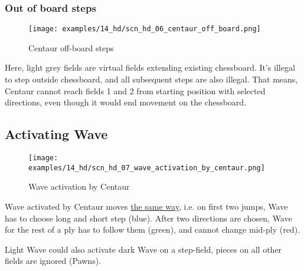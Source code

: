 \clearpage %

\subsubsection*{Out of board steps}

\vspace*{-0.05\textwidth}
\noindent
\begin{figure}[!h]
\texttt{[image: examples/14\_hd/scn\_hd\_06\_centaur\_off\_board.png]}
\caption{Centaur off-board steps}
\label{fig:scn_hd_06_centaur_off_board}
\end{figure}

Here, light grey fields are virtual fields extending existing chessboard.
It's illegal to step outside chessboard, and all subsequent steps are also
illegal. That means, Centaur cannot reach fields 1 and 2 from starting
position with selected directions, even though it would end movement on the
chessboard.

\clearpage %

\subsection*{Activating Wave}

\vspace*{-1.0\baselineskip}
\noindent
\begin{figure}[!h]
\texttt{[image: examples/14\_hd/scn\_hd\_07\_wave\_activation\_by\_centaur.png]}
\caption{Wave activation by Centaur}
\label{fig:scn_hd_07_wave_activation_by_centaur}
\end{figure}

Wave activated by Centaur moves \hyperref[fig:scn_hd_03_centaur_multi_step]{the same way},
i.e. on first two jumps, Wave has to choose long and short step (blue). After two directions
are chosen, Wave for the rest of a ply has to follow them (green), and cannot change mid-ply
(red).

Light Wave could also activate dark Wave on a step-field, pieces on all other fields are
ignored (Pawns).

